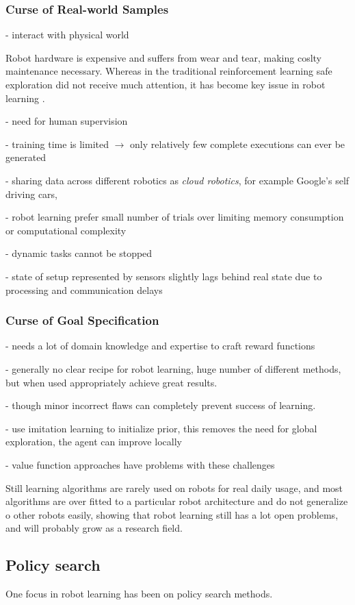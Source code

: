 \subsubsection{Curse of Real-world Samples}
- interact with physical world

Robot hardware is expensive and suffers from wear and tear, making
coslty maintenance necessary. Whereas 
in the traditional reinforcement learning safe exploration did
not receive much attention, it 
has become key issue in robot learning \citet{schneider1997exploiting}.


- need for human supervision

- training time is limited $\rightarrow$ only relatively few complete executions can ever be generated

- sharing data across different robotics as \textit{cloud robotics}, for example Google's self
driving cars,

- robot learning prefer small number of trials over limiting
memory consumption or computational complexity

- dynamic tasks cannot be stopped

- state of setup represented by sensors slightly lags behind real
state due to processing and communication delays

\subsubsection{Curse of Goal Specification}
- needs a lot of domain knowledge and expertise to craft reward functions

  - generally no clear recipe for robot learning, huge number of different methods,
  but when used appropriately achieve great results.

  - though minor incorrect flaws can completely prevent success of learning.

  - use imitation learning to initialize prior, this removes the need for global exploration,
  the agent can improve locally

  - value function approaches have problems with these challenges
  
Still learning algorithms are rarely used on robots for real daily usage, and most
algorithms are over fitted to a particular robot architecture and do not generalize
o other robots easily, showing that robot learning still has a lot open problems,
and will probably grow as a research field.

\subsection{Policy search}
One focus in robot learning has been on policy search methods.


